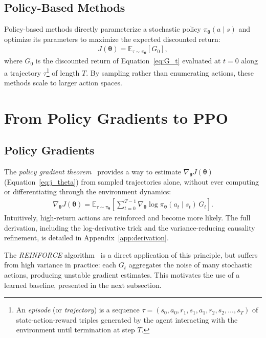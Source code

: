 \subsection{Policy-Based Methods}

Policy-based methods directly parameterize a stochastic policy $\pi_{\boldsymbol{\theta}}(a \mid s)$ and optimize its parameters to maximize the expected discounted return:
\begin{align}
J(\boldsymbol{\theta}) = \mathbb{E}_{\tau \sim \pi_{\boldsymbol{\theta}}} \left[ G_0 \right],
\label{eq:j_theta}
\end{align}
where $G_0$ is the discounted return of Equation~\ref{eq:G_t} evaluated at $t=0$ along a trajectory $\tau$\footnote{An \emph{episode} (or \emph{trajectory}) is a sequence $\tau = (s_0, a_0, r_1, s_1, a_1, r_2, s_2, \ldots, s_T)$ of state-action-reward triples generated by the agent interacting with the environment until termination at step $T$.} of length $T$. By sampling rather than enumerating actions, these methods scale to larger action spaces.

\section{From Policy Gradients to PPO}

\subsection{Policy Gradients}
\label{sec:policy-gradient}

The \emph{policy gradient theorem}~\cite{suttonPolicyGradientMethods} 
provides a way to estimate $\nabla_{\boldsymbol{\theta}} J(\boldsymbol{\theta})$ 
(Equation~\ref{eq:j_theta}) from sampled trajectories alone, without 
ever computing or differentiating through the environment dynamics:
\begin{align}
\nabla_{\boldsymbol{\theta}} J(\boldsymbol{\theta})
= \mathbb{E}_{\tau \sim \pi_{\boldsymbol{\theta}}} 
\left[ \sum_{t=0}^{T-1} \nabla_{\boldsymbol{\theta}} 
\log \pi_{\boldsymbol{\theta}}(a_t \mid s_t)\, G_t \right].
\label{eq:policy-gradient}
\end{align}
Intuitively, high-return actions are reinforced and become more likely. 
The full derivation, including the log-derivative trick and the 
variance-reducing causality refinement, is detailed in 
Appendix~\ref{app:derivation}.

The \emph{REINFORCE} algorithm~\cite{williamsSimpleStatisticalGradientfollowing1992} is a direct application of this principle, but suffers from high variance in practice: each $G_t$ aggregates the noise of many stochastic actions, producing unstable gradient estimates. This motivates the use of a learned baseline, presented in the next subsection.

